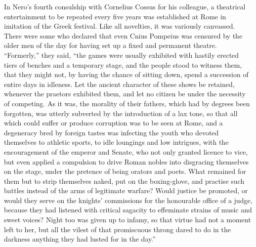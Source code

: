
In Nero's fourth consulship with Cornelius Cossus for his colleague, a theatrical entertainment to be repeated every five years was established at Rome in imitation of the Greek festival. Like all novelties, it was variously canvassed. There were some who declared that even Cnius Pompeius was censured by the older men of the day for having set up a fixed and permanent theatre. ``Formerly,'' they said, ``the games were usually exhibited with hastily erected tiers of benches and a temporary stage, and the people stood to witness them, that they might not, by having the chance of sitting down, spend a succession of entire days in idleness. Let the ancient character of these shows be retained, whenever the praetors exhibited them, and let no citizen be under the necessity of competing. As it was, the morality of their fathers, which had by degrees been forgotten, was utterly subverted by the introduction of a lax tone, so that all which could suffer or produce corruption was to be seen at Rome, and a degeneracy bred by foreign tastes was infecting the youth who devoted themselves to athletic sports, to idle loungings and low intrigues, with the encouragement of the emperor and Senate, who not only granted licence to vice, but even applied a compulsion to drive Roman nobles into disgracing themselves on the stage, under the pretence of being orators and poets. What remained for them but to strip themselves naked, put on the boxing-glove, and practise such battles instead of the arms of legitimate warfare? Would justice be promoted, or would they serve on the knights' commissions for the honourable office of a judge, because they had listened with critical sagacity to effeminate strains of music and sweet voices? Night too was given up to infamy, so that virtue had not a moment left to her, but all the vilest of that promiscuous throng dared to do in the darkness anything they had lusted for in the day.''


